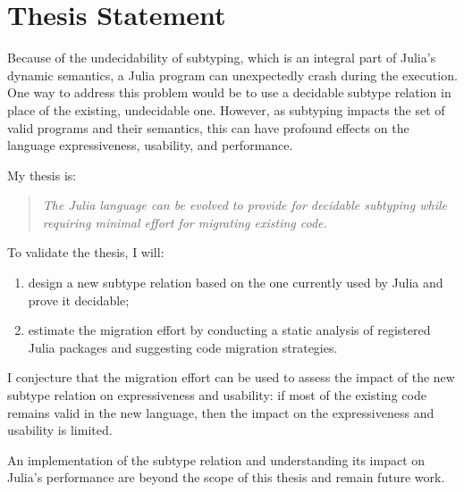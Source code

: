 \chapter{Thesis Statement}\label{chap:3}


Because of the undecidability of subtyping, which is an integral part of Julia's
dynamic semantics, a Julia program can
unexpectedly crash during the execution.
One way to address this problem would be to use a decidable subtype relation
in place of the existing, undecidable one.
However, as subtyping impacts the set of valid programs and their semantics,
this can have profound effects on the language expressiveness, 
usability, and performance.

My thesis is:
\begin{quotation}\emph{
  The Julia language can be evolved to provide for decidable subtyping while
  requiring minimal effort for migrating existing code.
}\end{quotation}

To validate the thesis, I will:
\begin{enumerate}
  \item design a new subtype relation based on the one currently used by Julia
    and prove it decidable;
  \item estimate the migration effort by conducting a static analysis of
    registered Julia packages and suggesting code migration strategies.
\end{enumerate}

I conjecture that the migration effort can be used to assess the impact of the
new subtype relation on expressiveness and usability:
if most of the existing code remains valid in the new language, 
then the impact on the expressiveness and usability is limited.

An implementation of the subtype relation and understanding its impact on
Julia's performance are beyond the scope of this thesis and
remain future work.

